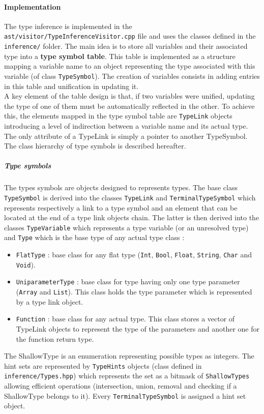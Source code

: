 \documentclass[a4paper,11pt]{article}
\begin{document}
\paragraph{Implementation} The type inference is implemented in the \texttt{ast/visitor/TypeInferenceVisitor.cpp} file and uses the classes defined in the \texttt{inference/} folder. The main idea is to store all variables and their associated type into a \textbf{type symbol table}. This table is implemented as a structure mapping a variable name to an object representing the type associated with this variable (of class \texttt{TypeSymbol}). The creation of variables consists in adding entries in this table and unification in updating it. \\
A key element of the table design is that, if two variables were unified, updating the type of one of them must be automatically reflected in the other. To achieve this, the elements mapped in the type symbol table are \texttt{TypeLink} objects introducing a level of indirection between a variable name and its actual type. The only attribute of a TypeLink is simply a pointer to another TypeSymbol. The class hierarchy of type symbols is described hereafter.
\subparagraph{Type symbols} The types symbols are objects designed to represents types. The base class \texttt{TypeSymbol} is derived into the classes \texttt{TypeLink} and \texttt{TerminalTypeSymbol} which represents respectively a link to a type symbol and an element that can be located at the end of a type link objects chain. The latter is then derived into the classes \texttt{TypeVariable} which represents a type variable (or an unresolved type) and \texttt{Type} which is the base type of any actual type class :
\begin{itemize}
	\item \texttt{FlatType} : base class for any flat type (\texttt{Int}, \texttt{Bool}, \texttt{Float}, \texttt{String}, \texttt{Char} and \texttt{Void}).
	\item \texttt{UniparameterType} : base class for type having only one type parameter (\texttt{Array} and \texttt{List}). This class holds the type parameter which is represented by a type link object.
	\item \texttt{Function} : base class for any actual type. This class stores a vector of TypeLink objects to represent the type of the parameters and another one for the function return type.
\end{itemize}
The ShallowType is an enumeration representing possible types as integers. The hint sets are represented by \texttt{TypeHints} objects (class defined in \texttt{inference/Types.hpp}) which represents the set as a bitmask of \texttt{ShallowTypes} allowing efficient operations (intersection, union, removal and checking if a ShallowType belongs to it). Every \texttt{TerminalTypeSymbol} is assigned a hint set object.
\end{document}
